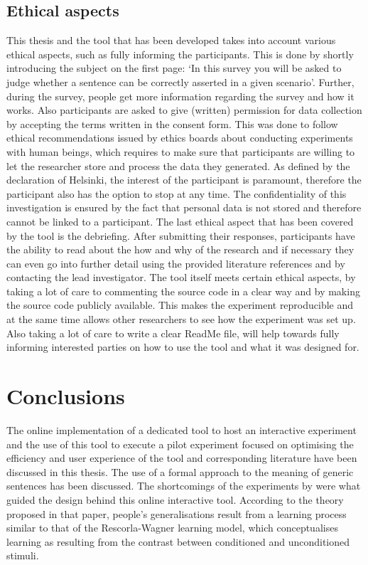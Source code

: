 \documentclass[twoside]{uva-inf-bachelor-thesis}
\theoremstyle{definition}
\begin{document}
\section{Ethical aspects}
This thesis and the tool that has been developed takes into account various ethical aspects, such as fully informing the participants. This is done by shortly introducing the subject on the first page: `In this survey you will be asked to judge whether a sentence can be correctly asserted in a given scenario'. Further, during the survey, people get more information regarding the survey and how it works. Also participants are asked to give (written) permission for data collection by accepting the terms written in the consent form. This was done to follow ethical recommendations issued by ethics boards about conducting experiments with human beings, which requires to make sure that participants are willing to let the researcher store and process the data they generated. As defined by the declaration of Helsinki, the interest of the participant is paramount, therefore the participant also has the option to stop at any time. The confidentiality of this investigation is ensured by the fact that personal data is not stored and therefore cannot be linked to a participant. The last ethical aspect that has been covered by the tool is the debriefing. After submitting their responses, participants have the ability to read about the how and why of the research and if necessary they can even go into further detail using the provided literature references and by contacting the lead investigator. The tool itself meets certain ethical aspects, by taking a lot of care to commenting the source code in a clear way and by making the source code publicly available. This makes the experiment reproducible and at the same time allows other researchers to see how the experiment was set up. Also taking a lot of care to write a clear ReadMe file, will help towards fully informing interested parties on how to use the tool and what it was designed for.

\chapter{Conclusions}
The online implementation of a dedicated tool to host an interactive experiment and the use of this tool to execute a pilot experiment focused on optimising the efficiency and user experience of the tool and corresponding literature have been discussed in this thesis. The use of a formal approach to the meaning of generic sentences has been discussed. The shortcomings of the experiments by \cite{RooijSchulzGenAlt} were what guided the design behind this online interactive tool. According to the theory proposed in that paper, people's generalisations result from a learning process similar to that of the Rescorla-Wagner learning model, which conceptualises learning as resulting from the contrast between conditioned and unconditioned stimuli. 
\end{document}
